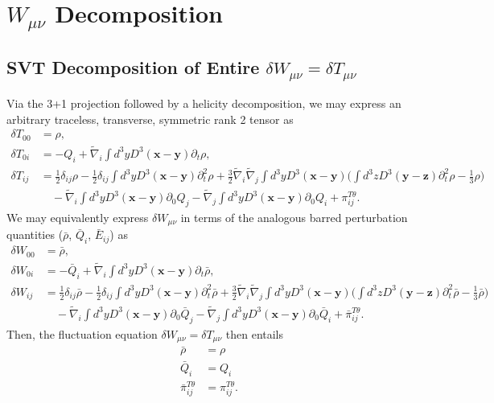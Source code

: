 \documentclass[10pt,letterpaper]{article}
\numberwithin{equation}{subsection}
\begin{document}
\section{$W_{\mu\nu}$ Decomposition}
\subsection{SVT Decomposition of Entire $\delta W_{\mu\nu} = \delta T_{\mu\nu}$}
Via the 3+1 projection followed by a helicity decomposition, we may express an arbitrary traceless, transverse, symmetric rank 2 tensor as
\begin{align}
\delta T_{00}  &= \rho,
\nonumber\\	
\delta T_{0i} &= -Q_i  + \tilde\nabla_i  \int d^3y D^3(\mathbf x-\mathbf y) \partial_t  \rho,
\nonumber\\	
\delta T_{ij}  &= 
\frac12 \delta_{ij} \rho - \frac12 \delta_{ij} \int d^3y D^3(\mathbf x-\mathbf y) \partial_t^2 \rho +\frac32 \tilde\nabla_i\tilde\nabla_j \int d^3y D^3(\mathbf x-\mathbf y) \bigg( \int d^3z D^3(\mathbf y-\mathbf z) \partial_t^2 \rho - \frac13\rho\bigg) 
\nonumber\\
&\quad -\tilde\nabla_i \int d^3y D^3(\mathbf x - \mathbf y) \partial_0 Q_j - \tilde\nabla_j \int d^3y D^3(\mathbf x - \mathbf y) \partial_0 Q_i + \pi_{ij}^{T\theta}.
\end{align}
We may equivalently express $\delta W_{\mu\nu}$ in terms of the analogous barred perturbation quantities ($\bar \rho$, $\bar Q_i$, $\bar E_{ij}$) as
\begin{align}
\delta W_{00}  &= \bar\rho,
\nonumber\\	
\delta W_{0i} &= -\bar Q_i  + \tilde\nabla_i  \int d^3y D^3(\mathbf x-\mathbf y) \partial_t  \bar\rho,
\nonumber\\	
\delta W_{ij}  &= 
\frac12 \delta_{ij} \bar\rho - \frac12 \delta_{ij} \int d^3y D^3(\mathbf x-\mathbf y) \partial_t^2 \bar\rho +\frac32 \tilde\nabla_i\tilde\nabla_j \int d^3y D^3(\mathbf x-\mathbf y) \bigg( \int d^3z D^3(\mathbf y-\mathbf z) \partial_t^2 \bar\rho - \frac13\bar\rho\bigg) 
\nonumber\\
&\quad -\tilde\nabla_i \int d^3y D^3(\mathbf x - \mathbf y) \partial_0  \bar Q_j - \tilde\nabla_j \int d^3y D^3(\mathbf x - \mathbf y) \partial_0 \bar Q_i + \bar \pi_{ij}^{T\theta}.
\end{align}
Then, the fluctuation equation $\delta W_{\mu\nu} = \delta T_{\mu\nu}$ then entails
\begin{align}
\bar \rho &= \rho
\nonumber\\
\bar Q_i &= Q_i
\nonumber\\
\bar \pi_{ij}^{T\theta} &= \pi_{ij}^{T\theta}.
\end{align}
\end{document}
